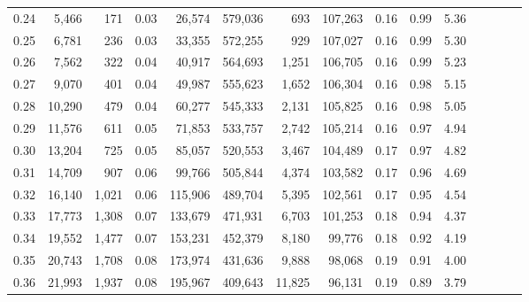 \begin{tabular}{rrrcrrrrrrrrrrr}
0.24 &   5,466 &    171 &                                       0.03 &   26,574 &  579,036 &      693 &  107,263 &  0.16 &  0.99 &                         5.36 \\
0.25 &   6,781 &    236 &                                       0.03 &   33,355 &  572,255 &      929 &  107,027 &  0.16 &  0.99 &                         5.30 \\
0.26 &   7,562 &    322 &                                       0.04 &   40,917 &  564,693 &    1,251 &  106,705 &  0.16 &  0.99 &                         5.23 \\
0.27 &   9,070 &    401 &                                       0.04 &   49,987 &  555,623 &    1,652 &  106,304 &  0.16 &  0.98 &                         5.15 \\
0.28 &  10,290 &    479 &                                       0.04 &   60,277 &  545,333 &    2,131 &  105,825 &  0.16 &  0.98 &                         5.05 \\
0.29 &  11,576 &    611 &                                       0.05 &   71,853 &  533,757 &    2,742 &  105,214 &  0.16 &  0.97 &                         4.94 \\
0.30 &  13,204 &    725 &                                       0.05 &   85,057 &  520,553 &    3,467 &  104,489 &  0.17 &  0.97 &                         4.82 \\
0.31 &  14,709 &    907 &                                       0.06 &   99,766 &  505,844 &    4,374 &  103,582 &  0.17 &  0.96 &                         4.69 \\
0.32 &  16,140 &  1,021 &                                       0.06 &  115,906 &  489,704 &    5,395 &  102,561 &  0.17 &  0.95 &                         4.54 \\
0.33 &  17,773 &  1,308 &                                       0.07 &  133,679 &  471,931 &    6,703 &  101,253 &  0.18 &  0.94 &                         4.37 \\
0.34 &  19,552 &  1,477 &                                       0.07 &  153,231 &  452,379 &    8,180 &   99,776 &  0.18 &  0.92 &                         4.19 \\
0.35 &  20,743 &  1,708 &                                       0.08 &  173,974 &  431,636 &    9,888 &   98,068 &  0.19 &  0.91 &                         4.00 \\
0.36 &  21,993 &  1,937 &                                       0.08 &  195,967 &  409,643 &   11,825 &   96,131 &  0.19 &  0.89 &                         3.79 \\

\end{tabular}
